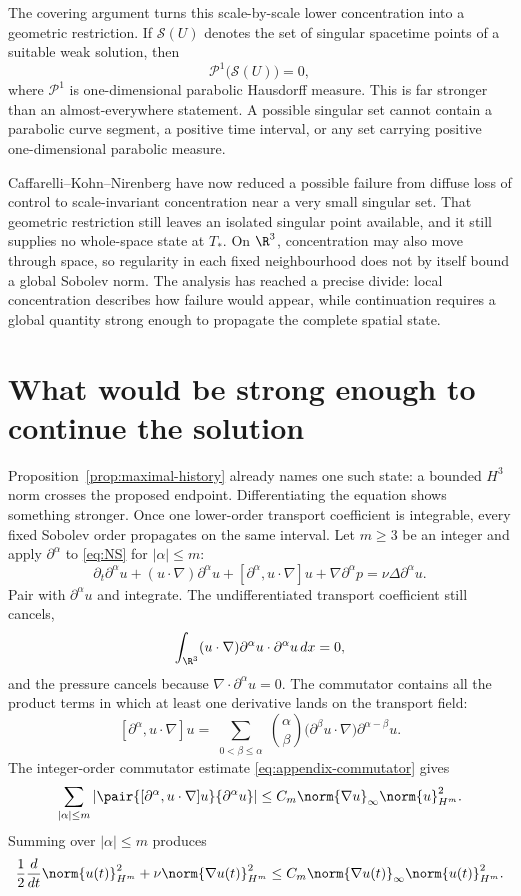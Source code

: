 The covering argument turns this scale-by-scale lower concentration into a
geometric restriction.  If \(\mathcal S(U)\) denotes the set of singular
spacetime points of a suitable weak solution, then
\begin{equation*}
 \mathcal P^1\bigl(\mathcal S(U)\bigr)=0,
\end{equation*}
where \(\mathcal P^1\) is one-dimensional parabolic Hausdorff
measure.  This is far stronger than an almost-everywhere statement.
A possible singular set cannot contain a parabolic curve segment, a positive
time interval, or any set carrying positive one-dimensional parabolic
measure.

Caffarelli--Kohn--Nirenberg have now reduced a possible failure from diffuse
loss of control to scale-invariant concentration near a very small singular
set.  That geometric restriction still leaves an isolated singular point
available, and it still supplies no whole-space state at \(T_*\).  On
\(\R^3\), concentration may also move through space, so regularity in each
fixed neighbourhood does not by itself bound a global Sobolev norm.  The
analysis has reached a precise divide: local concentration describes how failure
would appear, while continuation requires a global quantity strong enough to
propagate the complete spatial state.

\section{What would be strong enough to continue the solution}
\label{sec:high-order-continuation}

Proposition~\ref{prop:maximal-history} already names one such state: a bounded
\(H^3\) norm crosses the proposed endpoint.  Differentiating the equation
shows something stronger.  Once one lower-order transport coefficient is
integrable, every fixed Sobolev order propagates on the same interval.  Let
\(m\ge3\) be an integer and apply \(\partial^\alpha\) to \eqref{eq:NS} for
\(|\alpha|\le m\):
\[
 \partial_t\partial^\alpha u
 +(u\cdot\nabla)\partial^\alpha u
 +[\partial^\alpha,u\cdot\nabla]u
 +\nabla\partial^\alpha p
 =\nu\Delta\partial^\alpha u.
\]
Pair with \(\partial^\alpha u\) and integrate.  The undifferentiated transport
coefficient still cancels,
\[
 \int_{\R^3}(u\cdot\nabla)\partial^\alpha u
             \cdot\partial^\alpha u\,dx=0,
\]
and the pressure cancels because
\(\nabla\cdot\partial^\alpha u=0\).  The commutator contains all the product
terms in which at least one derivative lands on the transport field:
\[
 [\partial^\alpha,u\cdot\nabla]u
 =\sum_{\substack{0<\beta\le\alpha}}
   \binom{\alpha}{\beta}
   \bigl(\partial^\beta u\cdot\nabla\bigr)
   \partial^{\alpha-\beta}u.
\]
The integer-order commutator estimate
\eqref{eq:appendix-commutator} gives
\[
 \sum_{|\alpha|\le m}
 \left|
  \pair{[\partial^\alpha,u\cdot\nabla]u}{\partial^\alpha u}
 \right|
 \le C_m\norm{\nabla u}_\infty\norm{u}_{H^m}^2.
\]
Summing over \(|\alpha|\le m\) produces
\begin{equation}
 \frac12\frac d{dt}\norm{u(t)}_{H^m}^2
 +\nu\norm{\nabla u(t)}_{H^m}^2
 \le
 C_m\norm{\nabla u(t)}_\infty\norm{u(t)}_{H^m}^2.
 \label{eq:high-order-continuation}
\end{equation}

